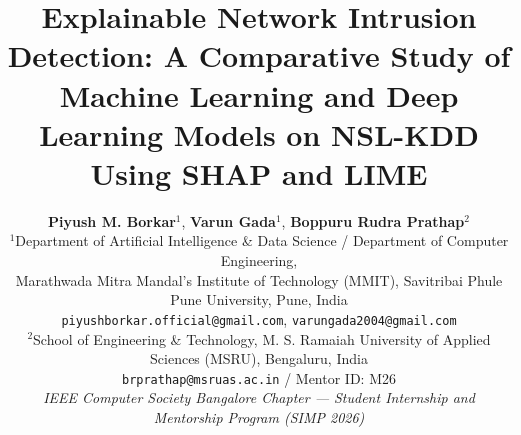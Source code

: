\documentclass[10pt,twocolumn]{article}
\begin{document}
\title{\textbf{\LARGE Explainable Network Intrusion Detection: A Comparative Study of Machine Learning and Deep Learning Models on NSL-KDD Using SHAP and LIME}}

\author{
  \textbf{Piyush M. Borkar}$^1$, \textbf{Varun Gada}$^1$, \textbf{Boppuru Rudra Prathap}$^2$\\[0.5ex]
  \small $^1$Department of Artificial Intelligence \& Data Science / Department of Computer Engineering,\\
  \small Marathwada Mitra Mandal's Institute of Technology (MMIT), Savitribai Phule Pune University, Pune, India\\
  \small \texttt{piyushborkar.official@gmail.com}, \texttt{varungada2004@gmail.com}\\[0.5ex]
  \small $^2$School of Engineering \& Technology, M. S. Ramaiah University of Applied Sciences (MSRU), Bengaluru, India\\
  \small \texttt{brprathap@msruas.ac.in} / Mentor ID: M26\\[0.5ex]
  \small \textit{IEEE Computer Society Bangalore Chapter --- Student Internship and Mentorship Program (SIMP 2026)}
}
\date{}
\maketitle
\end{document}
